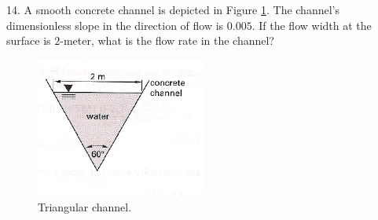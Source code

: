 \documentclass[11pt]{article}
\begin{document}
\begin{enumerate}
14. A smooth concrete channel is depicted in Figure \ref{fig:TriangleChannel}.  The channel's dimensionless slope in the direction of flow is $0.005$.  If the flow width at the surface is $2$-meter, what is the flow rate in the channel?

\begin{figure}[h!] %
\centering
   \includegraphics[width=2.2in]{TriangleChannel.jpg}
   \caption{Triangular channel.}
   \label{fig:TriangleChannel} 
\end{figure}
\clearpage



\end{enumerate}
\end{document}
